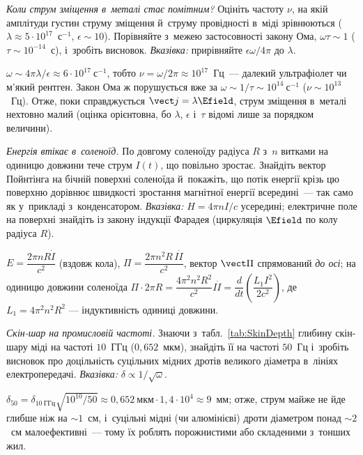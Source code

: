 \begin{problem}\label{prb:MetalDisplacementFreq}
	\emph{Коли струм зміщення в~металі стає помітним?} Оцініть частоту $\nu$, на якій амплітуди густин струму зміщення й~струму провідності в~міді зрівнюються ($\lambda\approx5\cdot10^{17}$~с$^{-1}$, $\epsilon\sim10$). Порівняйте з~межею застосовності закону Ома, $\omega\tau\sim1$ ($\tau\sim10^{-14}$~с), і~зробіть висновок. \emph{Вказівка:} прирівняйте $\epsilon\omega/4\pi$ до $\lambda$.
	\begin{solution}
		$\omega\sim4\pi\lambda/\epsilon\approx6\cdot10^{17}~\text{с}^{-1}$, тобто $\nu=\omega/2\pi\approx10^{17}$~Гц~--- далекий ультрафіолет чи м'який рентген. Закон Ома ж порушується вже за $\omega\sim1/\tau\sim10^{14}~\text{с}^{-1}$ ($\nu\sim10^{13}$~Гц). Отже, поки справджується $\vect j=\lambda\Efield$, струм зміщення в~металі нехтовно малий (оцінка орієнтовна, бо $\lambda$, $\epsilon$ і~$\tau$ відомі лише за порядком величини).
	\end{solution}
\end{problem}

\begin{problem}\label{prb:SolenoidPoynting}
	\emph{Енергія втікає в~соленоїд.} По довгому соленоїду радіуса $R$ з~$n$ витками на
	одиницю довжини тече струм $I(t)$, що повільно зростає. Знайдіть вектор Пойнтінга на
	бічній поверхні соленоїда й~покажіть, що потік енергії крізь цю поверхню дорівнює
	швидкості зростання магнітної енергії всередині~--- так само як у~прикладі
	з~конденсатором. \emph{Вказівка:} $H=4\pi nI/c$ усередині; електричне поле на
	поверхні знайдіть із закону індукції Фарадея (циркуляція $\Efield$ по колу радіуса
	$R$).
	\begin{solution}
		$E=\dfrac{2\pi nR\dot I}{c^2}$
		(вздовж кола), $\Pi=\dfrac{2\pi n^2R\,I\dot I}{c^2}$, вектор $\vect\Pi$ спрямований \emph{до осі}; на одиницю довжини соленоїда
		$\Pi\cdot2\pi R=\dfrac{4\pi^2n^2R^2}{c^2}I\dot I=\dfrac{d}{dt}\!\left(\dfrac{L_1I^2}{2c^2}\right)$, де $L_1=4\pi^2n^2R^2$ --- індуктивність
		одиниці довжини.
	\end{solution}
\end{problem}

\begin{problem}\label{prb:SkinDepthCopper50Hz}
	\emph{Скін-шар на промисловій частоті.} Знаючи з~табл.~\ref{tab:SkinDepth} глибину скін-шару міді на частоті $10$~ГГц
	($0{,}652$~мкм), знайдіть її на частоті $50$~Гц і~зробіть висновок про доцільність суцільних мідних дротів великого діаметра
	в~лініях електропередачі. \emph{Вказівка:} $\delta\propto1/\sqrt\omega$.
	\begin{solution}
		$\delta_{50}=\delta_{10\ \text{ГГц}}\sqrt{10^{10}/50}\approx 0{,}652~\text{мкм}\cdot1{,}4\cdot10^4\approx 9$~мм; отже, струм майже не йде глибше ніж на $\sim1$~см, і~суцільні мідні (чи алюмінієві) дроти діаметром понад $\sim2$~см малоефективні~--- тому їх роблять порожнистими або складеними з~тонших жил.
	\end{solution}
\end{problem}

